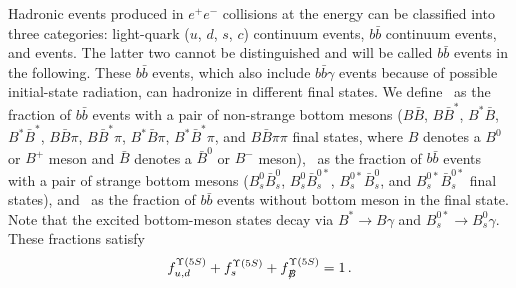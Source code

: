 Hadronic events produced in $e^+e^-$ collisions at the \Upsfive energy
can be classified into three categories: 
light-quark ($u$, $d$, $s$, $c$) continuum events, $b\bar{b}$ continuum events,
and \Upsfive events. The latter two cannot be distinguished and will be called
$b\bar{b}$ events in the following. These $b\bar{b}$ events, which also include 
$b\bar{b}\gamma$ events because of possible initial-state radiation, 
can hadronize in different final states.
We define \fudfive\ as
the fraction of $b\bar{b}$ events with a pair of non-strange 
bottom mesons 
($B\bar{B}$, $B\bar{B}^*$, $B^*\bar{B}$, $B^*\bar{B}^*$,
$B\bar{B}\pi$, $B\bar{B}^*\pi$, $B^*\bar{B}\pi$,
$B^*\bar{B}^*\pi$, and $B\bar{B}\pi\pi$ final states, 
where
$B$ denotes a $B^0$ or $B^+$ meson and 
$\bar{B}$ denotes a $\bar{B}^0$ or $B^-$ meson), \fsfive\ as
the fraction of $b\bar{b}$ events with a pair of strange bottom mesons
($B_s^0\bar{B}_s^0$, $B_s^0\bar{B}_s^{0*}$, $B_s^{0*}\bar{B}_s^0$, and
$B_s^{0*}\bar{B}_s^{0*}$ final states), and 
\fnBfive\ as the fraction of $b\bar{b}$ events without 
bottom meson in the final state.
Note that the excited bottom-meson states decay via $B^* \to B \gamma$ and
$B_s^{0*} \to B_s^0 \gamma$.
These fractions satisfy
\begin{equation}
\fudfive + \fsfive + \fnBfive = 1 \,.
\labe{sum_frac_five}
\end{equation} 

